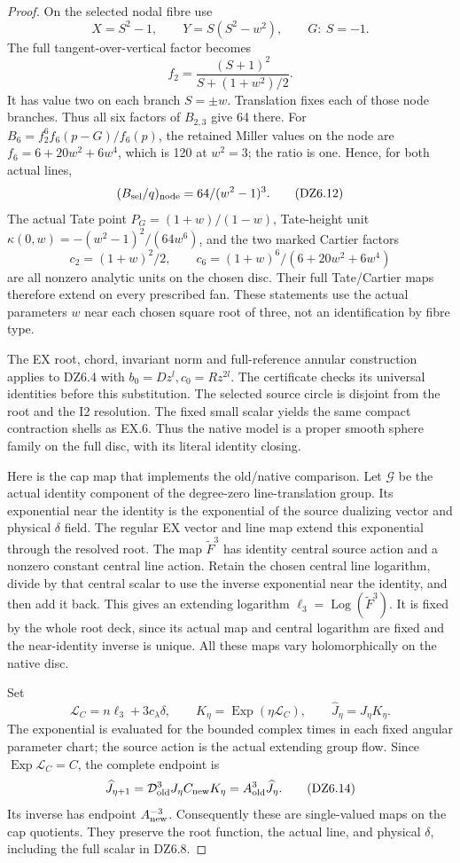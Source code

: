 \begin{proof}
On the selected nodal fibre use
\[
 X=S^2-1,\qquad Y=S(S^2-w^2),\qquad G:\ S=-1.
\]
The full tangent-over-vertical factor becomes
\[
 f_2=\frac{(S+1)^2}{S+(1+w^2)/2}.
\]
It has value two on each branch \(S=\pm w\). Translation fixes
each of those node branches. Thus all six factors of \(B_{2,3}\)
give 64 there. For \(B_6=f_2^6 f_6(p-G)/f_6(p)\), the retained
Miller values on the node are
\(f_6=6+20w^2+6w^4\), which is 120 at \(w^2=3\);
the ratio is one. Hence, for both actual lines,
\[
                       (B_{\rm sel}/q)_{\rm node}
                            =64/(w^2-1)^3.
 \tag{DZ6.12}
\]
The actual Tate point \(P_G=(1+w)/(1-w)\), Tate-height unit
\(\kappa(0,w)=-(w^2-1)^2/(64w^6)\), and the two marked
Cartier factors
\[
 c_2=(1+w)^2/2,\qquad
 c_6=(1+w)^6/(6+20w^2+6w^4)
\]
are all nonzero analytic units on the chosen disc. Their full
Tate/Cartier maps therefore extend on every prescribed fan.
These statements use the actual parameters \(w\) near each
chosen square root of three, not an identification by fibre type.

The EX root, chord, invariant norm and full-reference annular
construction applies to DZ6.4 with \(b_0=Dz^l,c_0=Rz^{2l}\).
The certificate checks its universal identities before this
substitution. The selected source circle is disjoint from the
root and the I2 resolution. The fixed small scalar yields the
same compact contraction shells as EX.6. Thus the native model
is a proper smooth sphere family on the full disc, with its
literal identity closing.

Here is the cap map that implements the old/native comparison.
Let \(\mathcal G\) be the actual identity component of the
degree-zero line-translation group. Its exponential near the
identity is the exponential of the source dualizing vector and
physical \(\delta\) field. The regular EX vector and line map
extend this exponential through the resolved root. The map
\(\widetilde F^3\) has identity central source action and a
nonzero constant central line action. Retain the chosen central
line logarithm, divide by that central scalar to use the inverse
exponential near the identity, and then add it back. This gives
an extending logarithm \(\ell_3=\operatorname{Log}(\widetilde F^3)\).
It is fixed by the whole root deck, since its actual map and
central logarithm are fixed and the near-identity inverse is
unique. All these maps vary holomorphically on the native disc.

Set
\[
 \mathcal L_C=n\ell_3+3c_\lambda\delta,\qquad
 K_\eta=\operatorname{Exp}(\eta\mathcal L_C),\qquad
 \widehat J_\eta=J_\eta K_\eta.
 \tag{DZ6.13}
\]
The exponential is evaluated for the bounded complex times in
each fixed angular parameter chart; the source action is the
actual extending group flow. Since \(\operatorname{Exp}\mathcal
L_C=C\), the complete endpoint is
\[
 \widehat J_{\eta+1}
  =\mathcal D_{\rm old}^3 J_\eta C_{\rm new}K_\eta
  =A_{\rm old}^3\widehat J_\eta.
 \tag{DZ6.14}
\]
Its inverse has endpoint \(A_{\rm new}^{-3}\).
Consequently these are single-valued maps on the cap quotients.
They preserve the root function, the actual line, and physical
\(\delta\), including the full scalar in DZ6.8.


\end{proof}
